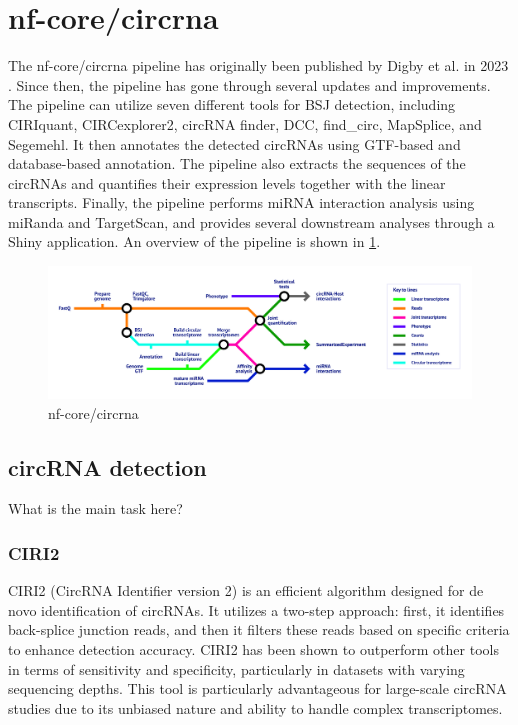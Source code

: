 \section{nf-core/circrna}
\label{sec:nf-core_circrna}
The nf-core/circrna pipeline has originally been published by Digby et al.
in
2023 \supercite{digby_nf-corecircrna_2023}.
Since then, the pipeline has gone through several updates and improvements.
The pipeline can utilize seven different tools for BSJ detection, including
CIRIquant, CIRCexplorer2, circRNA finder, DCC, find\_circ, MapSplice, and
Segemehl.
It then annotates the detected circRNAs using GTF-based and database-based
annotation.
The pipeline also extracts the sequences of the circRNAs and quantifies their
expression levels together with the linear transcripts.
Finally, the pipeline performs miRNA interaction analysis using miRanda and
TargetScan, and provides several downstream analyses through a Shiny
application.
An overview of the pipeline is shown in \cref{fig:circrna_pipeline}.

\begin{figure}[ht]
    \centering

    \includegraphics[width=\textwidth]{chapters/3_materials_and_methods/figures/nf-core_circrna.png}
    \caption{nf-core/circrna} %
    \label{fig:circrna_pipeline}
\end{figure}

\subsection{circRNA detection}
What is the main task here?

\subsubsection{CIRI2}
CIRI2 (CircRNA Identifier version 2) is an efficient algorithm designed for de
novo identification of circRNAs.
It utilizes a two-step approach: first, it identifies back-splice junction
reads, and then it filters these reads based on specific criteria to enhance
detection accuracy.
CIRI2 has been shown to outperform other tools in terms of sensitivity and
specificity, particularly in datasets with varying sequencing
depths\supercite{gao_ciri_2015,zheng_reconstruction_2019}.
This tool is particularly advantageous for large-scale circRNA studies due to
its unbiased nature and ability to handle complex
transcriptomes\supercite{chuang_assessing_2023}.

